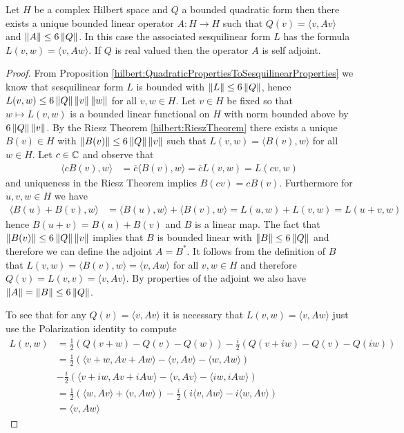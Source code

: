 \begin{prop}\label{hilbert:OperatorFromQuadraticForm}Let $H$ be a
  complex Hilbert space and $Q$ a bounded quadratic form then there
  exists a unique bounded linear operator $A : H \to H$ such that
  $Q(v) = \langle v, A v \rangle$ and $\left \lVert A \right \rVert \leq 6\left \lVert Q \right \rVert$.  In this case the associated sesquilinear form $L$ has the formula $L(v,w) = \langle v, A w \rangle$.  If $Q$ is real valued then the operator $A$ is self adjoint.
\end{prop}
\begin{proof}
From Proposition
\ref{hilbert:QuadraticPropertiesToSesquilinearProperties} we know that
sesquilinear form $L$ is bounded with $\left \lVert L \right \rVert \leq 6 \left \lVert Q \right \rVert$,
hence $L(v,w) \leq 6 \left \lVert Q \right \rVert \left \lVert v \right \rVert\left \lVert w \right \rVert$ for all $v,w \in H$.
Let $v \in H$ be fixed so that $w \mapsto L(v,w)$ is a bounded linear
functional on $H$ with norm bounded above by $6 \left \lVert Q \right \rVert \left \lVert v \right \rVert$.
By the Riesz Theorem \ref{hilbert:RieszTheorem} there exists a unique $B(v) \in H$ with
$\left \lVert B(v) \right \rVert \leq 6 \left \lVert Q \right \rVert \left \lVert v \right \rVert$ such that $L(v,w) = \langle B(v), w \rangle$ for all $w \in H$.  Let $c \in \mathbb{C}$ and observe that 
\begin{align*}
\langle c B(v), w \rangle &= \overline{c} \langle B(v), w \rangle = \overline{c} L(v,w) = L(cv, w)
\end{align*}
and uniqueness in the Riesz Theorem implies $B(cv) = cB(v)$.  Furthermore for $u,v, w \in H$ we have 
\begin{align*}
\langle  B(u) + B(v), w \rangle &= \langle  B(u), w \rangle  + \langle B(v), w \rangle = L(u,w) + L(v,w) = L(u+v, w)
\end{align*}
hence $B(u+v) = B(u) + B(v)$ and $B$ is a linear map.  The fact that
$\left \lVert B(v) \right \rVert \leq 6 \left \lVert Q \right \rVert \left \lVert v \right \rVert$ implies that $B$ is bounded
linear with $\left \lVert B \right \rVert \leq 6 \left \lVert Q \right \rVert$ and therefore we can define the
adjoint $A = B^*$.  It follows from the definition of $B$ that $L(v,w)
= \langle B(v) , w \rangle = \langle v, A w \rangle$ for all $v,w \in
H$ and therefore $Q(v) = L(v,v) = \langle v, A v \rangle$.  By
properties of the adjoint we also have $\left \lVert A \right \rVert = \left \lVert B \right \rVert \leq 6
\left \lVert Q \right \rVert$.  

To see that for any $Q(v) = \langle v, A v \rangle$ it is necessary that $L(v,w) = \langle v, Aw \rangle$ just use the Polarization identity to compute
\begin{align*}
L(v,w) &= \frac{1}{2} \left ( Q(v+w) - Q(v) - Q(w) \right) - \frac{i}{2} \left (Q(v+iw) - Q(v) - Q(iw) \right) \\
       &=\frac{1}{2} \left ( \langle v+w, Av + Aw \rangle - \langle v, Av \rangle - \langle w, A w \rangle \right) \\
       &- \frac{i}{2} \left ( \langle v+iw, Av + i Aw \rangle - \langle v, A v \rangle - \langle iw, i A w \rangle \right)  \\
&=\frac{1}{2} \left ( \langle w, Av \rangle + \langle v, Aw \rangle \right) - \frac{i}{2} \left ( i \langle v, Aw \rangle -  i \langle w, A v \rangle \right) \\
&= \langle v, Aw \rangle
\end{align*}


\end{proof}
